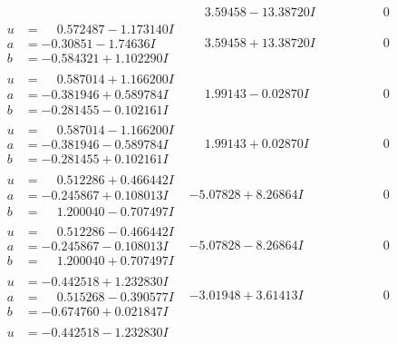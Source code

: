 \documentclass[1p]{elsarticle_modified}
\theoremstyle{definition}
\begin{document}
$$\begin{array}{c|c|c}
 & \phantom{-}3.59458 - 13.38720 I & \phantom{-0.000000 } 0 \\ \hline\begin{aligned}
u &= \phantom{-}0.572487 - 1.173140 I \\
a &= -0.30851 - 1.74636 I \\
b &= -0.584321 + 1.102290 I\end{aligned}
 & \phantom{-}3.59458 + 13.38720 I & \phantom{-0.000000 } 0 \\ \hline\begin{aligned}
u &= \phantom{-}0.587014 + 1.166200 I \\
a &= -0.381946 + 0.589784 I \\
b &= -0.281455 - 0.102161 I\end{aligned}
 & \phantom{-}1.99143 - 0.02870 I & \phantom{-0.000000 } 0 \\ \hline\begin{aligned}
u &= \phantom{-}0.587014 - 1.166200 I \\
a &= -0.381946 - 0.589784 I \\
b &= -0.281455 + 0.102161 I\end{aligned}
 & \phantom{-}1.99143 + 0.02870 I & \phantom{-0.000000 } 0 \\ \hline\begin{aligned}
u &= \phantom{-}0.512286 + 0.466442 I \\
a &= -0.245867 + 0.108013 I \\
b &= \phantom{-}1.200040 - 0.707497 I\end{aligned}
 & -5.07828 + 8.26864 I & \phantom{-0.000000 } 0 \\ \hline\begin{aligned}
u &= \phantom{-}0.512286 - 0.466442 I \\
a &= -0.245867 - 0.108013 I \\
b &= \phantom{-}1.200040 + 0.707497 I\end{aligned}
 & -5.07828 - 8.26864 I & \phantom{-0.000000 } 0 \\ \hline\begin{aligned}
u &= -0.442518 + 1.232830 I \\
a &= \phantom{-}0.515268 - 0.390577 I \\
b &= -0.674760 + 0.021847 I\end{aligned}
 & -3.01948 + 3.61413 I & \phantom{-0.000000 } 0 \\ \hline\begin{aligned}
u &= -0.442518 - 1.232830 I \\

\end{aligned}
\end{array}$$
\end{document}
